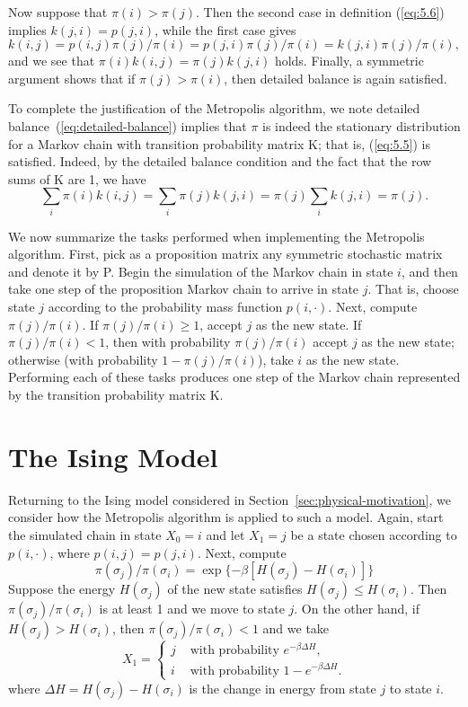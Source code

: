 \documentclass[12pt,letterpaper]{report}
\theoremstyle{plain}
\theoremstyle{definition}
\theoremstyle{remark}
\numberwithin{theorem}{chapter}
\numberwithin{claim}{chapter}
\numberwithin{equation}{chapter}
\numberwithin{conjecture}{chapter}
\newcommand\<{\ensuremath{\langle}}
\renewcommand\>{\ensuremath{\rangle}}
\begin{document}
Now suppose that $\pi(i) > \pi(j)$. Then the second case in definition (\ref{eq:5.6}) implies
$k(j,i) =p(j,i)$, while the first case gives
\[
k(i,j) = p(i,j)\pi(j)/\pi(i) =  p(j,i)\pi(j)/\pi(i) = k(j,i)\pi(j)/\pi(i),
\]
and we see that 
$\pi(i)k(i,j) = \pi(j)k(j,i)$ holds.
Finally, a symmetric argument shows that if $\pi(j) > \pi(i)$,
then detailed balance is again satisfied.

To complete the justification of the Metropolis algorithm, we note
detailed balance~(\ref{eq:detailed-balance})
implies that $\pi$ is indeed the stationary distribution for a Markov 
chain with transition probability matrix K; that is, (\ref{eq:5.5}) is
satisfied. Indeed, by the detailed balance condition and the fact that
the row sums of K are 1, we have
\begin{equation*}
\sum_i \pi(i)k(i,j)
=\sum_i \pi(j)k(j,i)
=\pi(j)\sum_i k(j,i)
 = \pi(j).
\end{equation*}


We now summarize the tasks performed when implementing the Metropolis algorithm.
First, pick as a proposition matrix any symmetric stochastic matrix and denote
it by P. Begin 
%
%
%
the simulation of the Markov chain in state $i$, and then take one step of the
proposition Markov chain to arrive in state $j$. That is, choose state $j$
according to the probability mass function $p(i, \cdot)$. 
Next, compute $\pi(j)/\pi(i)$. 
If $\pi(j)/\pi(i) \geq 1$, accept $j$ as the new state. If $\pi(j)/\pi(i) < 1$,
then with probability $\pi(j)/\pi(i)$ accept $j$ as the new state; otherwise
(with probability $1- \pi(j)/\pi(i)$), take $i$ as the new state. Performing
each of these tasks produces one step of the Markov chain represented by the 
transition probability matrix K.


\section{The Ising Model}
\label{sec:ising-model}
Returning to the Ising model considered in
Section~\ref{sec:physical-motivation}, we consider how the Metropolis 
algorithm is applied to such a model. Again, start the simulated chain in state
$X_0 = i$ and let $X_1 = j$ be a state chosen according to 
$p(i, \cdot)$, where $p(i,j) = p(j,i)$. Next, compute 
\[
\pi(\sigma_j)/\pi(\sigma_i) = \exp\{-\beta[H(\sigma_j) - H(\sigma_i)]\}
\]
Suppose the energy $H(\sigma_j)$ of the new state satisfies 
$H(\sigma_j) \leq H(\sigma_i)$.
Then $\pi(\sigma_j)/\pi(\sigma_i)$ is at least 1 and we move to state $j$.
On the other hand, if
$H(\sigma_j) > H(\sigma_i)$,
then $\pi(\sigma_j)/\pi(\sigma_i)< 1$ and we take
\begin{equation}
\label{eq:5.8}
X_1 = 
\begin{cases}
j & \text{ with probability $e^{-\beta\Delta H}$},\\
i & \text{ with probability $1-e^{-\beta\Delta H}$}.
\end{cases}
\end{equation}
where $\Delta H = H(\sigma_j) - H(\sigma_i)$ is the change in energy from state $j$ to state $i$.
\end{document}
